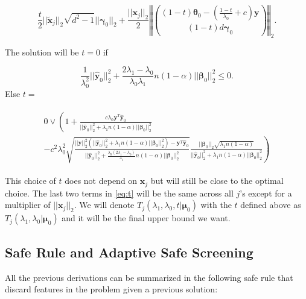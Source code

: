 \begin{equation}
    \frac{t}{2}||\tilde{\boldsymbol x}_j||_2\sqrt{d^2-1}||\boldsymbol\gamma_{0}||_2+\frac{||\boldsymbol x_j||_2}{2}\left\Vert\binom{(1-t)\boldsymbol\theta_{0}-\left(\frac{1-t}{\lambda_0}+c\right)\boldsymbol y}{(1-t)d\boldsymbol\gamma_{0}}\right\Vert_2.
\end{equation}

The solution will be $t=0$ if

\begin{equation}
    \label{eq:t0}
    \frac{1}{\lambda_0^2}||\hat{\boldsymbol y}_{0}||_2^2+\frac{2\lambda_1-\lambda_0}{\lambda_0\lambda_1}n(1-\alpha)||\boldsymbol\beta_{0}||_2^2\leq 0.
\end{equation}
Else $t=$

\begin{gather}
    \label{eq:tn0}
    \begin{aligned}
        0\vee\left(1+\frac{c\lambda_0\boldsymbol y^T\hat{\boldsymbol y}_{0}}{||\hat{\boldsymbol y}_{0}||_2^2+\lambda_1n(1-\alpha)||\boldsymbol\beta_{0}||_2^2}\right.\\
        \left.-c^2\lambda_0^2\sqrt{\frac{||\boldsymbol y||_2^2\left(||\hat{\boldsymbol y}_{0}||_2^2+\lambda_1n(1-\alpha)||\boldsymbol\beta_{0}||_2^2\right)-\boldsymbol y^T\hat{\boldsymbol y}_{0}}{||\hat{\boldsymbol y}_{0}||_2^2+\frac{\lambda_0(2\lambda_1-\lambda_0)}{\lambda_1}n(1-\alpha)||\boldsymbol\beta_{0}||_2^2}}
        \frac{||\boldsymbol\beta_{0}||_2\sqrt{\lambda_1n(1-\alpha)}}{||\hat{\boldsymbol y}_{0}||_2^2+\lambda_1n(1-\alpha)||\boldsymbol\beta_{0}||_2^2}\right)
    \end{aligned}
\end{gather}

This choice of $t$ does not depend on $\boldsymbol x_j$ but will still be close to the optimal choice. The last two terms in \eqref{eq:t} will be the same across all $j$'s except for a multiplier of $||\boldsymbol x_j||_2$. We will denote $T_j(\lambda_1,\lambda_0,t|\boldsymbol\mu_0)$ with the $t$ defined above as $T_j(\lambda_1,\lambda_0|\boldsymbol\mu_0)$ and it will be the final upper bound we want.

\subsection{Safe Rule and Adaptive Safe Screening}

All the previous derivations can be summarized in the following safe rule that discard features in the problem given a previous solution:

